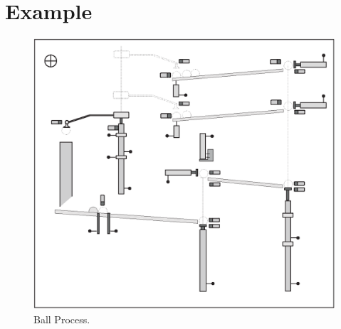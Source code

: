\chapter{Example}
\label{example}

\begin{figure}
\begin{center}
\includegraphics{images/example/ballprocess.eps}
\caption{Ball Process.}
\label{f:BallProcess}
\end{center}
\end{figure}